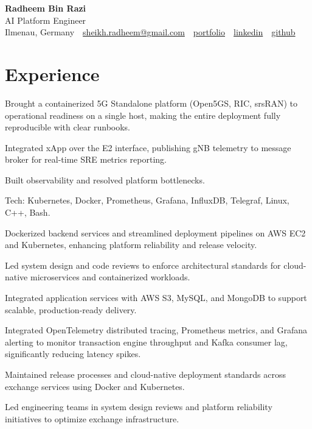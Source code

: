 \documentclass[10pt,a4paper]{resume}
\makeatletter
\newcommand{\Portfolio}{https://radheem.github.io/my-cv}
\newcommand{\PortfolioText}{portfolio}
\newcommand{\GitHub}{https://github.com/radheem}
\newcommand{\LinkedIn}{https://www.linkedin.com/in/radheem-razi}
\newcommand{\Email}{sheikh.radheem@gmail.com}
\makeatother
\begin{document}
\begin{center}
  {\huge\bfseries Radheem Bin Razi}\\[3pt]
  {\large AI Platform Engineer}\\[6pt]
  \small
  Ilmenau, Germany \,\textbar\,
  \href{mailto:\Email}{\Email} \,\textbar\,
  \href{\Portfolio}{\PortfolioText} \,\textbar\,
  \href{\LinkedIn}{linkedin} \,\textbar\,
  \href{\GitHub}{github}
\end{center}
\vspace{2pt}

\section{Experience}

\bullets
  \item Brought a containerized 5G Standalone platform (Open5GS, RIC, srsRAN) to operational readiness on a single host, making the entire deployment fully reproducible with clear runbooks.
  \item Integrated xApp over the E2 interface, publishing gNB telemetry to message broker for real-time SRE metrics reporting.
  \item Built observability and resolved platform bottlenecks.
  \item Tech: Kubernetes, Docker, Prometheus, Grafana, InfluxDB, Telegraf, Linux, C++, Bash.
\bulletsend
\vspace{1.5pt}
\bullets
  \item Dockerized backend services and streamlined deployment pipelines on AWS EC2 and Kubernetes, enhancing platform reliability and release velocity.
  \item Led system design and code reviews to enforce architectural standards for cloud-native microservices and containerized workloads.
  \item Integrated application services with AWS S3, MySQL, and MongoDB to support scalable, production-ready delivery.
\bulletsend
\vspace{1.5pt}
\bullets
  \item Integrated OpenTelemetry distributed tracing, Prometheus metrics, and Grafana alerting to monitor transaction engine throughput and Kafka consumer lag, significantly reducing latency spikes.
  \item Maintained release processes and cloud-native deployment standards across exchange services using Docker and Kubernetes.
  \item Led engineering teams in system design reviews and platform reliability initiatives to optimize exchange infrastructure.
\bulletsend
\vspace{1.5pt}
\end{document}
